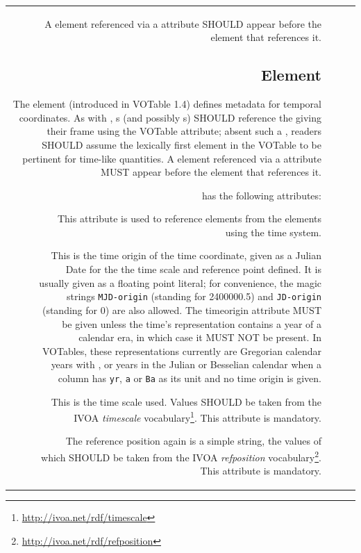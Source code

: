 \begin{tabular}{RRCp{0.8\textwidth}}
\begin{center}
A  element referenced via a  attribute
SHOULD appear before the element that references it.

\subsection{\texorpdfstring{ Element}
	{TIMESYS Element}}
\label{elem:TIMESYS}

The  element (introduced in VOTable 1.4) defines metadata
for temporal coordinates.  As with , s (and
possibly s) SHOULD reference the  giving their
frame using the VOTable  attribute; absent such a ,
readers SHOULD assume the lexically first  element in the
VOTable to be pertinent for time-like quantities. A  element referenced via a  attribute
MUST appear before the element that references it.

 has the following attributes:

\begin{description}
\item[] This attribute is used to reference 
elements from the elements using the time system.
\item[] This is the time origin of the time coordinate,
given as a Julian Date for the the time scale and reference point
defined.  It is usually given as a floating point
literal; for convenience, the magic strings \verb|MJD-origin| (standing
for 2400000.5) and \verb|JD-origin| (standing for 0) are also allowed.
The timeorigin attribute MUST be given unless the time's representation
contains a year of a calendar era, in which case it MUST NOT be present.  
In VOTables, these
representations currently are Gregorian calendar years with
, or years in the Julian or Besselian calendar when a column
has \verb|yr|, \verb|a| or \verb|Ba| as its unit and no time origin is 
given. 
\item[]  This is the time scale used.  Values SHOULD be
taken from the IVOA \emph{timescale}
vocabulary\footnote{\url{http://ivoa.net/rdf/timescale}}.  This
attribute is mandatory.
\item[] The reference position again is a simple string,
the values of which SHOULD be taken from the IVOA \emph{refposition}
vocabulary\footnote{\url{http://ivoa.net/rdf/refposition}}.  This
attribute is mandatory.
\end{description}


\end{center}
\end{tabular}
